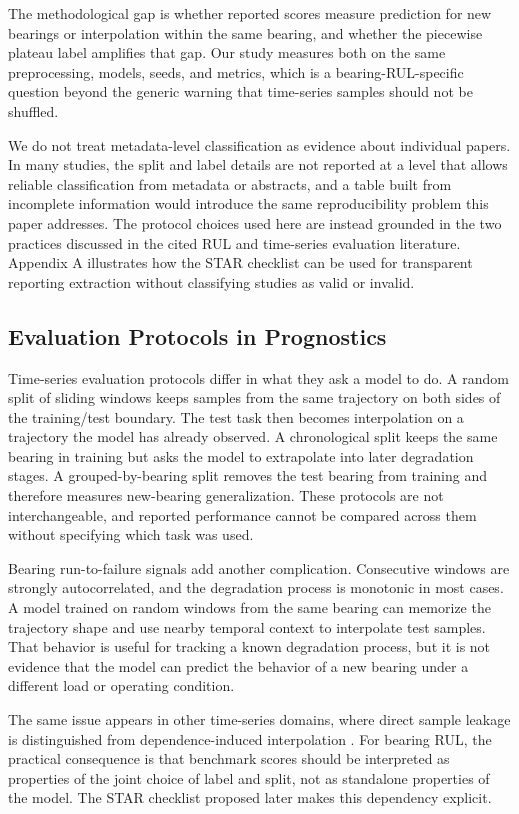 \documentclass[pdflatex,sn-mathphys-num]{sn-jnl}
\begin{document}
The methodological gap is whether reported scores measure prediction for new bearings or interpolation within the same bearing, and whether the piecewise plateau label amplifies that gap. Our study measures both on the same preprocessing, models, seeds, and metrics, which is a bearing-RUL-specific question beyond the generic warning that time-series samples should not be shuffled.

We do not treat metadata-level classification as evidence about individual papers. In many studies, the split and label details are not reported at a level that allows reliable classification from metadata or abstracts, and a table built from incomplete information would introduce the same reproducibility problem this paper addresses. The protocol choices used here are instead grounded in the two practices discussed in the cited RUL and time-series evaluation literature. Appendix A illustrates how the STAR checklist can be used for transparent reporting extraction without classifying studies as valid or invalid.

\subsection{Evaluation Protocols in Prognostics}
Time-series evaluation protocols differ in what they ask a model to do. A random split of sliding windows keeps samples from the same trajectory on both sides of the training/test boundary. The test task then becomes interpolation on a trajectory the model has already observed. A chronological split keeps the same bearing in training but asks the model to extrapolate into later degradation stages. A grouped-by-bearing split removes the test bearing from training and therefore measures new-bearing generalization. These protocols are not interchangeable, and reported performance cannot be compared across them without specifying which task was used.

Bearing run-to-failure signals add another complication. Consecutive windows are strongly autocorrelated, and the degradation process is monotonic in most cases. A model trained on random windows from the same bearing can memorize the trajectory shape and use nearby temporal context to interpolate test samples. That behavior is useful for tracking a known degradation process, but it is not evidence that the model can predict the behavior of a new bearing under a different load or operating condition.

The same issue appears in other time-series domains, where direct sample leakage is distinguished from dependence-induced interpolation \cite{leakage_nature,leakage_frontiers}. For bearing RUL, the practical consequence is that benchmark scores should be interpreted as properties of the joint choice of label and split, not as standalone properties of the model. The STAR checklist proposed later makes this dependency explicit.
\end{document}
